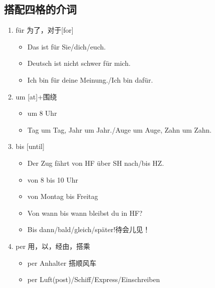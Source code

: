 \documentclass[12pt,A4paper,oneside,reqno]{amsart}
\numberwithin{equation}{section}
\theoremstyle{plain}
\theoremstyle{plain}
\theoremstyle{plain}
\numberwithin{equation}{section}
\theoremstyle{remark}
\begin{document}
\subsection{搭配四格的介词}
\begin{enumerate}[1.]
	\item f\"{u}r 为了，对于[for]
	\begin{itemize}
		\item Das ist f\"{u}r Sie/dich/euch.
		\item Deutsch ist nicht schwer f\"{u}r mich.
		\item Ich bin f\"{u}r deine Meinung./Ich bin daf\"{u}r.
	\end{itemize}
	\item um [at]+围绕
	\begin{itemize}
		\item um 8 Uhr
		\item Tag um Tag, Jahr um Jahr./Auge um Auge, Zahn um Zahn.
	\end{itemize}
	\item bis [until]
\begin{itemize}
	\item Der Zug f\"{a}hrt von HF \"{u}ber SH nach/bis HZ.
	\item von 8 bis 10 Uhr
	\item von Montag bis Freitag
	\item Von wann bis wann bleibst du in HF?
	\item Bis dann/bald/gleich/sp\"{a}ter!待会儿见！
\end{itemize}
	\item per 用，以，经由，搭乘
\begin{itemize}
	\item per Anhalter 搭顺风车
	\item per Luft(post)/Schiff/Express/Einschreiben
\end{itemize}
\end{enumerate}

\end{document}
